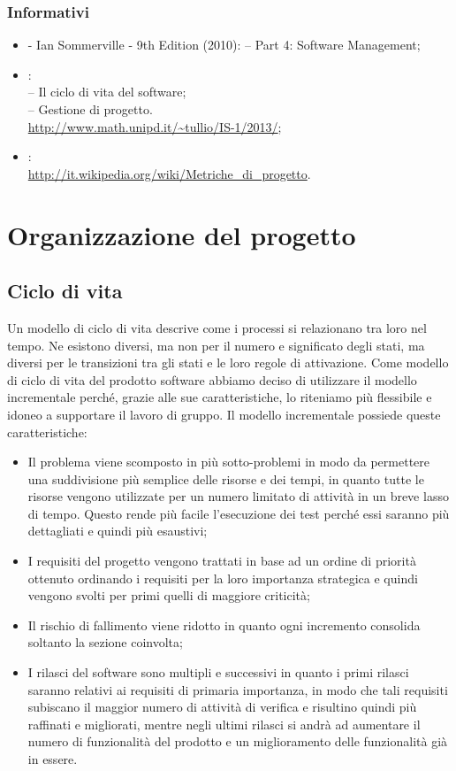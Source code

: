 \subsubsection{Informativi}
\label{1.4.2}
\begin{itemize}
\item {} - Ian Sommerville - 9th Edition (2010):
– Part 4: Software Management;
\item {}:\\
– Il ciclo di vita del software;\\
– Gestione di progetto.\\
\url{http://www.math.unipd.it/~tullio/IS-1/2013/};
\item {}:\\
\url{http://it.wikipedia.org/wiki/Metriche_di_progetto}.
\end{itemize}

\section{Organizzazione del progetto}
\subsection{Ciclo di vita}
\label{2.5}
Un modello di ciclo di vita descrive come i processi si relazionano tra loro nel tempo. Ne esistono diversi, ma non per il numero e significato degli stati, ma diversi per le transizioni tra gli stati e le loro regole di attivazione.
Come modello di ciclo di vita del prodotto software abbiamo deciso di utilizzare il modello incrementale perché, grazie alle sue caratteristiche, lo riteniamo più flessibile e idoneo a supportare il lavoro di gruppo. Il modello incrementale possiede queste caratteristiche: 
\begin{itemize}
\item Il problema viene scomposto in più sotto-problemi in modo da permettere una suddivisione più semplice delle risorse e dei tempi, in quanto tutte le risorse vengono utilizzate per un numero limitato di attività in un breve lasso di tempo. Questo rende più facile l'esecuzione dei test perché essi saranno più dettagliati e quindi più esaustivi;
\item I requisiti del progetto vengono trattati in base ad un ordine di priorità ottenuto ordinando i requisiti per la loro importanza strategica e quindi vengono svolti per primi quelli di maggiore criticità;
\item Il rischio di fallimento viene ridotto in quanto ogni incremento consolida soltanto la sezione coinvolta;
\item I rilasci del software sono multipli e successivi in quanto i primi rilasci saranno relativi ai requisiti di primaria importanza, in modo che tali requisiti subiscano il maggior numero di attività di verifica e risultino quindi più raffinati e migliorati, mentre negli ultimi rilasci si andrà ad aumentare il numero di funzionalità del prodotto e un miglioramento delle funzionalità già in essere.
\end{itemize}

